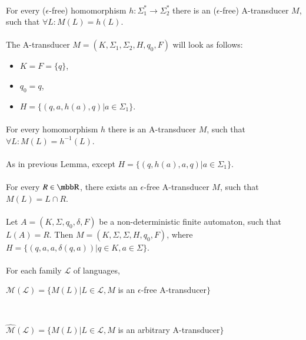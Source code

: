 \paragraph{}
\clema For every ($\epsilon $-free) homomorphism $h: \Sigma_{1}^{*} \rightarrow \Sigma_{2}^{*}$ there is an ($\epsilon $-free) A-transducer $M$, such that $\forall L: M(L) = h(L)$.

\paragraph{}
\dokaz The A-transducer $M=(K, \Sigma_{1}, \Sigma_{2}, H, q_{0}, F)$ will look as follows:
\begin{itemize}
\item $K = F = \{ q \}$,
\item $q_{0} = q$,
\item $H = \{ (q, a, h(a), q) | a \in \Sigma_{1} \}$. \square
\end{itemize}

\paragraph{}
\clema For every homomorphism $h$ there is an A-transducer $M$, such that $\forall L: M(L) = h^{-1}(L)$.

\paragraph{}
\dokaz As in previous Lemma, except $H = \{ (q, h(a), a, q) | a \in \Sigma_{1} \}$. \square

\paragraph{}
\clema For every $R \in \R $, there exists an $\epsilon $-free A-transducer $M$, such that $M(L) = L \cap R$.

\paragraph{}
\dokaz Let $A = (K, \Sigma, q_{0}, \delta, F)$ be a non-deterministic finite automaton, such that $L(A) = R$. Then $M=(K, \Sigma, \Sigma, H, q_{0}, F)$, where $H=\{ (q, a, a, \delta (q,a)) | q \in K, a \in \Sigma \} $. \square

\paragraph{}
\oznacenie For each family $\mathcal{L} $ of languages, \\
\centerline{$\mathcal{M(L)} = \{ M(L) | L \in \mathcal{L}, M$ is an $\epsilon $-free A-transducer$\} $} \\
\centerline{$\mathcal{\hat{M}(L)} = \{ M(L) | L \in \mathcal{L}, M$ is an arbitrary A-transducer$\} $}

